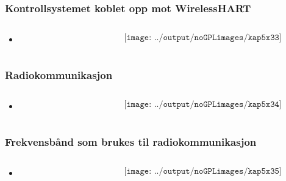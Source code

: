 \documentclass[aspectratio=169,xcolor=dvipsnames]{beamer}
\begin{document}
\begin{frame}
	\frametitle{Kontrollsystemet koblet opp mot WirelessHART}
	\begin{columns}
		\begin{column}{0.5\textwidth}

			\begin{itemize}
				\item      
			\end{itemize}

			
		\end{column}

		\begin{column}{0.5\textwidth}
	$$\texttt{[image: ../output/noGPLimages/kap5x33]}$$
		\end{column}
	\end{columns}
\end{frame}
\begin{frame}
	\frametitle{Radiokommunikasjon}
	\begin{columns}
		\begin{column}{0.5\textwidth}

			\begin{itemize}
				\item      
			\end{itemize}

			
		\end{column}

		\begin{column}{0.5\textwidth}
	$$\texttt{[image: ../output/noGPLimages/kap5x34]}$$
		\end{column}
	\end{columns}
\end{frame}
\begin{frame}
	\frametitle{Frekvensbånd som brukes til radiokommunikasjon}
	\begin{columns}
		\begin{column}{0.5\textwidth}

			\begin{itemize}
				\item      
			\end{itemize}

			
		\end{column}

		\begin{column}{0.5\textwidth}
	$$\texttt{[image: ../output/noGPLimages/kap5x35]}$$
		\end{column}
	\end{columns}
\end{frame}
\end{document}
